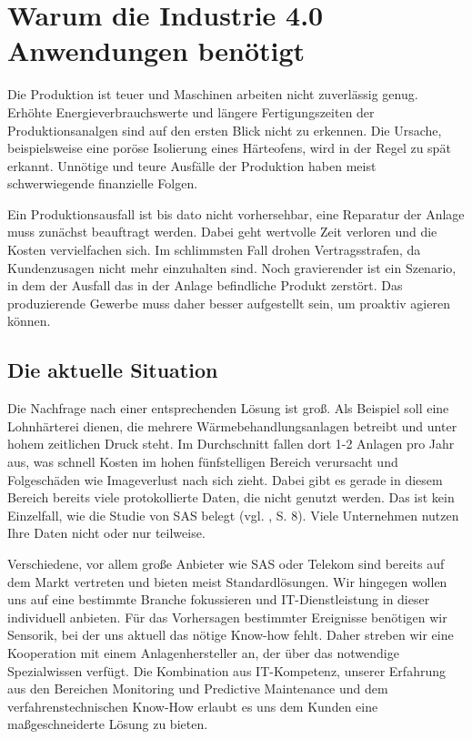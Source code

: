 \newpage
\section{Warum die Industrie 4.0 Anwendungen benötigt}

Die Produktion ist teuer und Maschinen arbeiten nicht zuverlässig genug. Erhöhte Energieverbrauchswerte und längere Fertigungszeiten der Produktionsanalgen sind auf den ersten Blick nicht zu erkennen. Die Ursache, beispielsweise eine poröse Isolierung eines Härteofens, wird in der Regel zu spät erkannt. Unnötige und teure Ausfälle der Produktion haben meist schwerwiegende finanzielle Folgen.

Ein Produktionsausfall ist bis dato nicht vorhersehbar, eine Reparatur der Anlage muss zunächst beauftragt werden. Dabei geht wertvolle Zeit verloren und die Kosten vervielfachen sich. Im schlimmsten Fall drohen Vertragsstrafen, da Kundenzusagen nicht mehr einzuhalten sind. Noch gravierender ist ein Szenario, in dem der Ausfall das in der Anlage befindliche Produkt zerstört. Das produzierende Gewerbe muss daher besser aufgestellt sein, um proaktiv agieren können. 


\subsection{Die aktuelle Situation}
Die Nachfrage nach einer entsprechenden Lösung ist groß. Als Beispiel soll eine Lohnhärterei dienen, die mehrere Wärmebehandlungsanlagen betreibt und unter hohem zeitlichen Druck steht. Im Durchschnitt fallen dort 1-2 Anlagen pro Jahr aus, was schnell Kosten im hohen fünfstelligen Bereich verursacht und Folgeschäden wie Imageverlust nach sich zieht. Dabei gibt es gerade in diesem Bereich bereits viele protokollierte Daten, die nicht genutzt werden. Das ist kein Einzelfall, wie die Studie von SAS belegt (vgl. \cite{SasForsa}, S. 8). Viele Unternehmen nutzen Ihre Daten nicht oder nur teilweise.

Verschiedene, vor allem große Anbieter wie SAS oder Telekom sind bereits auf dem Markt vertreten und bieten meist Standardlösungen. Wir hingegen wollen uns auf eine bestimmte Branche fokussieren und IT-Dienstleistung in dieser individuell anbieten. Für das Vorhersagen bestimmter Ereignisse benötigen wir Sensorik, bei der uns aktuell das nötige Know-how fehlt. Daher streben wir eine Kooperation mit einem Anlagenhersteller an, der über das notwendige Spezialwissen verfügt. Die Kombination aus IT-Kompetenz, unserer Erfahrung aus den Bereichen Monitoring und Predictive Maintenance und dem verfahrenstechnischen Know-How erlaubt es uns dem Kunden eine maßgeschneiderte Lösung zu bieten.

